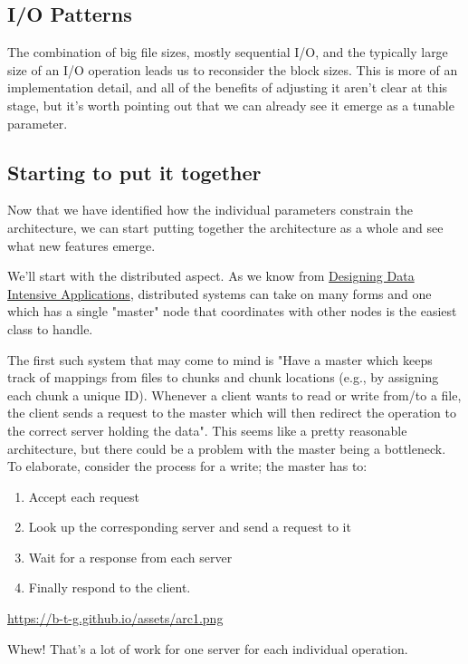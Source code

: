 \documentclass[11pt]{article}
\begin{document}
\subsection*{I/O Patterns}
\label{sec:org462555c}
The combination of big file sizes, mostly sequential I/O, and the typically large size of an I/O operation leads us to reconsider the block sizes. This is more of an implementation detail,
and all of the benefits of adjusting it aren't clear at this stage, but it's worth pointing out that we can already see it emerge as a tunable parameter.

\subsection*{Starting to put it together}
\label{sec:org9444fb2}
Now that we have identified how the individual parameters constrain the architecture, we can start putting together the architecture as a whole and see what new features emerge.

We'll start with the distributed aspect. As we know from \href{https://dataintensive.net/}{Designing Data Intensive Applications}, distributed systems can take on many forms and one which has
a single "master" node that coordinates with other nodes is the easiest class to handle.

The first such system that may come to mind is "Have a master which keeps track of mappings from files to chunks
and chunk locations (e.g., by assigning each chunk a unique ID). Whenever a client wants to read or write from/to a file, the client sends a request to the master which will then redirect
the operation to the correct server holding the data". This seems like a pretty reasonable architecture, but there could be a problem with the master being a bottleneck.
To elaborate, consider the process for a write; the master has to:
\begin{enumerate}
\item Accept each request
\item Look up the corresponding server and send a request to it
\item Wait for a response from each server
\item Finally respond to the client.
\end{enumerate}

\url{https://b-t-g.github.io/assets/arc1.png}

Whew! That's a lot of work for one server for each individual operation.
\end{document}
